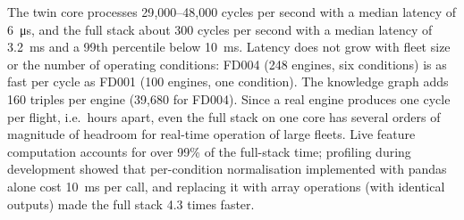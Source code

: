 The twin core processes 29{,}000--48{,}000 cycles per second with a median latency of
\SI{6}{\micro\second}, and the full stack about 300 cycles per second with a median latency of
\SI{3.2}{\milli\second} and a 99th percentile below \SI{10}{\milli\second}. Latency does not grow
with fleet size or the number of operating conditions: FD004 (248 engines, six conditions) is as
fast per cycle as FD001 (100 engines, one condition). The knowledge graph adds 160 triples per
engine (39{,}680 for FD004). Since a real engine produces one cycle per flight, i.e.\ hours apart,
even the full stack on one core has several orders of magnitude of headroom for real-time
operation of large fleets. Live feature computation accounts for over 99\% of the full-stack time;
profiling during development showed that per-condition normalisation implemented with pandas
alone cost \SI{10}{\milli\second} per call, and replacing it with array operations (with
identical outputs) made the full stack 4.3 times faster.

